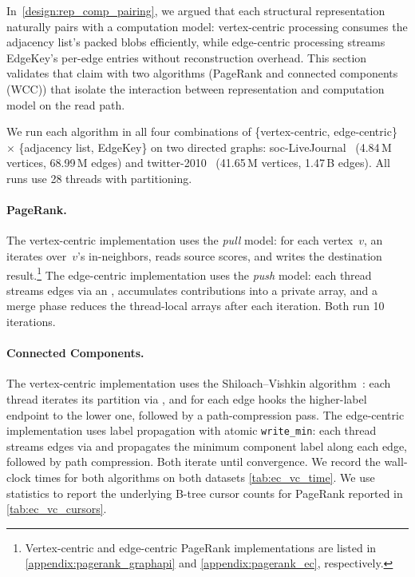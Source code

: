 In~\autoref{design:rep_comp_pairing}, we argued that each structural representation naturally pairs with a computation model: vertex-centric processing consumes the adjacency list's packed blobs efficiently, while edge-centric processing streams EdgeKey's per-edge entries without reconstruction overhead.
This section validates that claim with two algorithms (PageRank and connected components (WCC)) that isolate the interaction between representation and computation model on the read path.

We run each algorithm in all four combinations of \{vertex-centric, edge-centric\} $\times$ \{adjacency list, EdgeKey\} on two directed graphs: soc-LiveJournal~\cite{socLiveJournal} (4.84\,M vertices, 68.99\,M edges) and twitter-2010~\cite{twitter2010} (41.65\,M vertices, 1.47\,B edges).
All runs use 28 threads with  partitioning.

\paragraph{PageRank.}
The vertex-centric implementation uses the \emph{pull} model: for each vertex~$v$, an  iterates over~$v$'s in-neighbors, reads source scores, and writes the destination result.\footnote{Vertex-centric and edge-centric PageRank implementations are listed in \autoref{appendix:pagerank_graphapi} and \autoref{appendix:pagerank_ec}, respectively.}
The edge-centric implementation uses the \emph{push} model: each thread streams edges via an , accumulates contributions into a private array, and a merge phase reduces the thread-local arrays after each iteration.
Both run 10 iterations.

\paragraph{Connected Components.}
The vertex-centric implementation uses the Shiloach--Vishkin algorithm~\cite{shiloach1982logn}: each thread iterates its partition via , and for each edge hooks the higher-label endpoint to the lower one, followed by a path-compression pass.
The edge-centric implementation uses label propagation with atomic \texttt{write\_min}: each thread streams edges via  and propagates the minimum component label along each edge, followed by path compression.
Both iterate until convergence.
We record the wall-clock times for both algorithms on both datasets \autoref{tab:ec_vc_time}.
We use \wt{} statistics to report the underlying \wt{} B-tree cursor counts for PageRank reported in \autoref{tab:ec_vc_cursors}.

